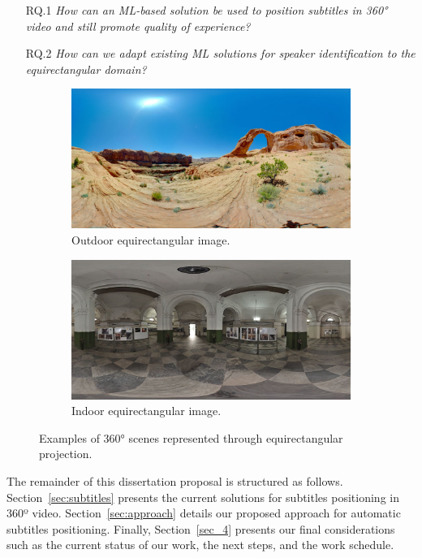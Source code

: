 \begin{itemize}
    \item[RQ.1] \emph{How can an ML-based solution be used to position subtitles in 360° video and still promote quality of experience?}
    \item[RQ.2] \emph{How can we adapt existing ML solutions for speaker identification to the equirectangular domain?}
\end{itemize}

\begin{figure}[!ht]
\centering
    \begin{subfigure}{0.47\linewidth}
        \centering
        \includegraphics[width=1\textwidth]{img/image (9).jpg}
        \caption{Outdoor equirectangular image.}
        \label{subfig:out_equi}
    \end{subfigure}\hfill
    \begin{subfigure}{0.47\linewidth}
        \centering
        \includegraphics[width=1\textwidth]{img/image (10).JPG}
        \caption{Indoor equirectangular image.}
        \label{subfig:in_equi}
    \end{subfigure}

\caption{Examples of 360° scenes represented through equirectangular projection.}
\label{fig:equirectangular_proj}
\end{figure}

The remainder of this dissertation proposal is structured as follows. Section~\ref{sec:subtitles} presents the current solutions for subtitles positioning in 360º video. Section~\ref{sec:approach} details our proposed approach for automatic subtitles positioning. Finally, Section~\ref{sec_4} presents our final considerations such as the current status of our work, the next steps, and the work schedule.